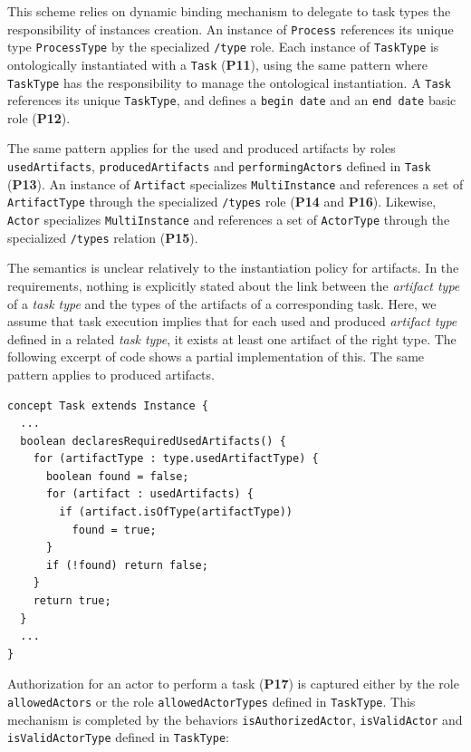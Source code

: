 This scheme relies on \FML dynamic binding mechanism to delegate to task types the responsibility of instances creation. An instance of \texttt{Process} references its unique type \texttt{ProcessType} by the specialized \texttt{/type} role. Each instance of \texttt{TaskType} is ontologically instantiated with a \texttt{Task} (\textbf{P11}), using the same pattern where \texttt{TaskType} has the responsibility to manage the ontological instantiation. A \texttt{Task} references its unique \texttt{TaskType}, and defines a \texttt{begin date} and an \texttt{end date} basic role (\textbf{P12}).

The same pattern applies for the used and produced artifacts by roles \texttt{usedArtifacts}, \texttt{producedArtifacts} and \texttt{performingActors} defined in \texttt{Task} (\textbf{P13}). An instance of \texttt{Artifact} specializes \texttt{MultiInstance} and references a set of \texttt{ArtifactType} through the specialized \texttt{/types} role (\textbf{P14} and \textbf{P16}). Likewise, \texttt{Actor} specializes \texttt{MultiInstance} and references a set of \texttt{ActorType} through the specialized \texttt{/types} relation (\textbf{P15}).

The semantics is unclear relatively to the instantiation policy for artifacts. In the requirements, nothing is explicitly stated about the link between the \emph{artifact type} of a \emph{task type} and the types of the artifacts of a corresponding task.
Here, we assume that task execution implies that for each used and produced \emph{artifact type} defined in a related \emph{task type}, it exists at least one artifact of the right type. The following excerpt of \FML code shows a partial implementation of this. The same pattern applies to produced artifacts.

\begin{lstlisting}
concept Task extends Instance {
  ...
  boolean declaresRequiredUsedArtifacts() {
    for (artifactType : type.usedArtifactType) {
      boolean found = false;
      for (artifact : usedArtifacts) {
        if (artifact.isOfType(artifactType))
          found = true;
      }
      if (!found) return false;
    }
    return true;
  }
  ...
}
\end{lstlisting}

Authorization for an actor to perform a task (\textbf{P17}) is captured either by the role \texttt{allowedActors} or the role \texttt{allowedActorTypes} defined in \texttt{TaskType}. This mechanism is completed by the behaviors \texttt{isAuthorizedActor}, \texttt{isValidActor} and \texttt{isValidActorType} defined in \texttt{TaskType}:

